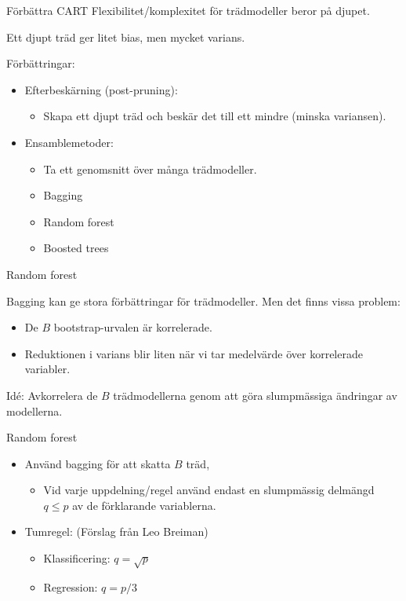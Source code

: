 \documentclass[10pt,english]{beamer}
\begin{document}
\begin{frame}{Förbättra CART}
    Flexibilitet/komplexitet för trädmodeller beror på djupet.
    \begin{redbox}
        Ett djupt träd ger litet bias, men mycket varians.
    \end{redbox}
    
    Förbättringar:
    \begin{itemize}
        \item Efterbeskärning (post-pruning):
        \begin{itemize}
            \item Skapa ett djupt träd och beskär det till ett mindre (minska variansen).
        \end{itemize}
        \item Ensamblemetoder:
        \begin{itemize}
            \item Ta ett genomsnitt över många trädmodeller.
            \item Bagging
            \item Random forest
            \item Boosted trees
        \end{itemize}
    \end{itemize}
\end{frame}

\begin{frame}{Random forest}
    
    Bagging kan ge stora förbättringar för trädmodeller. Men det finns vissa problem:
    \begin{itemize}
        \item De $B$ bootstrap-urvalen är korrelerade.
        \item Reduktionen i varians blir liten när vi tar medelvärde över korrelerade variabler.
    \end{itemize}

    Idé: Avkorrelera de $B$ trädmodellerna genom att göra slumpmässiga ändringar av modellerna.

\end{frame}

\begin{frame}{Random forest}
    
    \begin{itemize}
        \item Använd bagging för att skatta $B$ träd,
        \begin{itemize}
            \item Vid varje uppdelning/regel använd endast en slumpmässig delmängd $q \leq p$ av de förklarande variablerna.
        \end{itemize}
        \item Tumregel: (Förslag från Leo Breiman)
        \begin{itemize}
            \item Klassificering: $q = \sqrt{p}$
            \item Regression: $q = p/3$
        \end{itemize}
    \end{itemize}

\end{frame}
\end{document}
